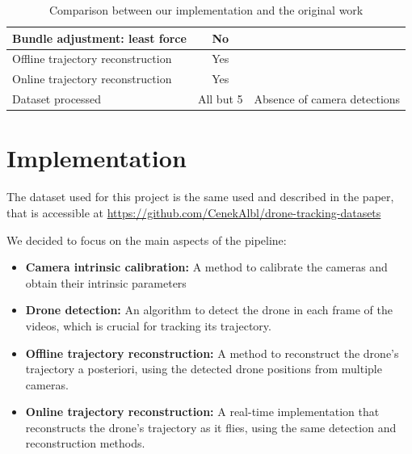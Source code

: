\documentclass[11pt]{article}
\begin{document}
\begin{table}[h]
\begin{tabularx}{\textwidth}{|Y|c|Y|}
        Bundle adjustment: least force                  & No                   &                                                                                                                    \\\hline
        Offline trajectory reconstruction               & Yes                  &                                                                                                                    \\\hline
        Online trajectory reconstruction                & Yes                  &                                                                                                                    \\\hline
        Dataset processed                               & All but 5            & Absence of camera detections                                                                                       \\\hline
    \end{tabularx}
    \caption{Comparison between our implementation and the original work}
    \label{tab:comparison}
\end{table}

\section{Implementation}

The dataset used for this project is the same used and described in the paper, that is accessible at \url{https://github.com/CenekAlbl/drone-tracking-datasets}

We decided to focus on the main aspects of the pipeline:

\begin{itemize}
    \item \textbf{Camera intrinsic calibration:} A method to calibrate the cameras and obtain their intrinsic parameters
    \item \textbf{Drone detection:} An algorithm to detect the drone in each frame of the videos, which is crucial for tracking its trajectory.
    \item \textbf{Offline trajectory reconstruction:} A method to reconstruct the drone's trajectory a posteriori, using the detected drone positions from multiple cameras.
    \item \textbf{Online trajectory reconstruction:} A real-time implementation that reconstructs the drone's trajectory as it flies, using the same detection and reconstruction methods.
\end{itemize}
\end{document}
